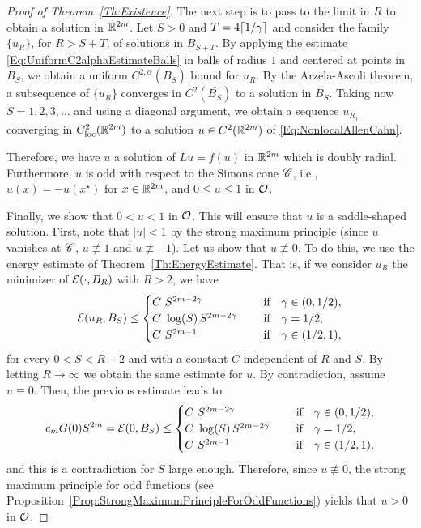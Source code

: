 \begin{proof}[Proof of Theorem~\ref{Th:Existence}]
The next step is to pass to the limit in $R$ to obtain a solution in $\mathbb{R}^{2m}$. Let $S>0$ and $T =4\lceil 1/\gamma\rceil$ and consider the family $\{u_R\}$, for $R> S + T$, of solutions in $B_{S+T}$. By applying the estimate \eqref{Eq:UniformC2alphaEstimateBalls} in balls of radius $1$ and centered at points in $\overline{B_{S}}$, we obtain a uniform $C^{2,\alpha}(\overline{B_S})$ bound for $u_R$. By the Arzela-Ascoli theorem, a subsequence of $\{u_R\}$ converges in $C^2(\overline{B_S})$ to a solution in $B_S$. Taking now $S = 1,2,3,\ldots$ and using a diagonal argument, we obtain a sequence $u_{R_j}$ converging in $C^2_{\mathrm{loc}}(\mathbb{R}^{2m})$ to a solution $u \in C^2(\mathbb{R}^{2m})$ of \eqref{Eq:NonlocalAllenCahn}.

Therefore, we have $u$ a solution of $Lu = f(u)$ in $\mathbb{R}^{2m}$ which is doubly radial. Furthermore, $u$ is odd with respect to the Simons cone $\mathscr{C}$, i.e., $u(x) = -u(x^\star)$ for $x\in \mathbb{R}^{2m}$, and $0 \leq u\leq 1$ in $\mathcal{O}$.

Finally, we show that $0<u<1$ in $\mathcal{O}$. This will ensure that $u$ is a saddle-shaped solution. First, note that $|u| < 1$ by the strong maximum principle (since $u$ vanishes at $\mathscr{C}$, $u \not \equiv 1$  and $u\not\equiv -1$). Let us show that $u\not\equiv 0$. To do this, we use the energy estimate of Theorem~\ref{Th:EnergyEstimate}. That is, if we consider $u_R$ the minimizer of $\mathcal{E}(\cdot, B_R)$ with $R > 2$, we have
$$
\mathcal{E} (u_R,B_S) \leq \begin{cases}
C \ S^{2m-2\gamma}\ \ \ \ &\textrm{if } \ \ \gamma\in(0,1/2),\\
C\ \log(S)\,S^{2m-2\gamma}\ \ \ \ &\textrm{if } \ \ \gamma=1/2,\\
C \ S^{2m-1}\ \ \ \ &\textrm{if } \ \ \gamma\in(1/2,1),\\
\end{cases} $$
for every $0 < S < R-2$ and with a constant $C$ independent of $R$ and $S$. By letting $R \to \infty$ we obtain the same estimate for $u$. By contradiction, assume $u\equiv 0$. Then, the previous estimate leads to
$$
c_m G(0)S^{2m} = \mathcal{E}(0, B_S) \leq \begin{cases}
C \ S^{2m-2\gamma}\ \ \ \ &\textrm{if } \ \ \gamma\in(0,1/2),\\
C\ \log(S)\,S^{2m-2\gamma}\ \ \ \ &\textrm{if } \ \ \gamma=1/2,\\
C \ S^{2m-1}\ \ \ \ &\textrm{if } \ \ \gamma\in(1/2,1),\\
\end{cases} $$
and this is a contradiction for $S$ large enough. Therefore, since $u \not \equiv 0$, the strong maximum principle for odd functions (see Proposition~\ref{Prop:StrongMaximumPrincipleForOddFunctions}) yields that $u>0$ in $\mathcal{O}$. 
\end{proof}

